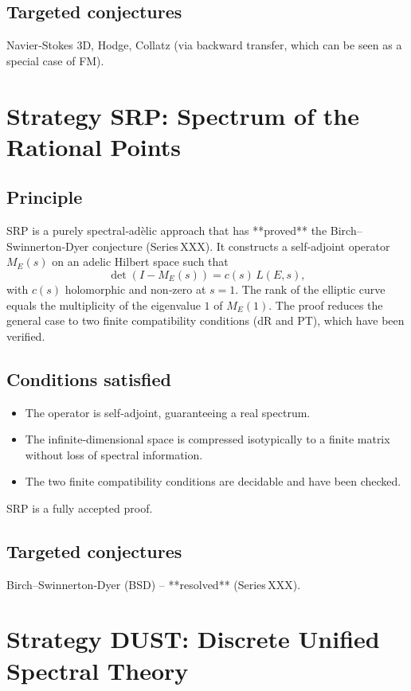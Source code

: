 \documentclass[11pt,a4paper]{article}
\begin{document}
\subsection{Targeted conjectures}
Navier‑Stokes 3D, Hodge, Collatz (via backward transfer, which can be seen as a special case of FM).

\section{Strategy SRP: Spectrum of the Rational Points}

\subsection{Principle}
SRP is a purely spectral‑adèlic approach that has **proved** the Birch–Swinnerton‑Dyer conjecture (Series XXX). It constructs a self‑adjoint operator \(M_E(s)\) on an adelic Hilbert space such that
\[
\det(I - M_E(s)) = c(s)\, L(E,s),
\]
with \(c(s)\) holomorphic and non‑zero at \(s=1\). The rank of the elliptic curve equals the multiplicity of the eigenvalue \(1\) of \(M_E(1)\). The proof reduces the general case to two finite compatibility conditions (dR and PT), which have been verified.

\subsection{Conditions satisfied}
\begin{itemize}
\item The operator is self‑adjoint, guaranteeing a real spectrum.
\item The infinite‑dimensional space is compressed isotypically to a finite matrix without loss of spectral information.
\item The two finite compatibility conditions are decidable and have been checked.
\end{itemize}
SRP is a fully accepted proof.

\subsection{Targeted conjectures}
Birch–Swinnerton‑Dyer (BSD) – **resolved** (Series XXX).

\section{Strategy DUST: Discrete Unified Spectral Theory}
\end{document}
